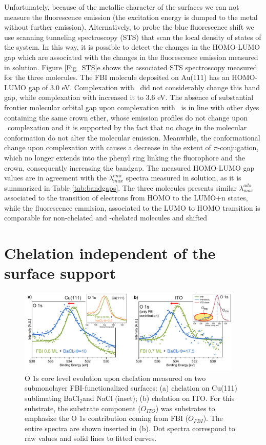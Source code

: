 \documentclass[aps,prl,reprint,longbibliography,superscriptaddress, english]{revtex4-1}
\def\BappCl{BaCl$_2$}
\begin{document}
Unfortunately, because of the metallic character of the surfaces we can not measure the fluorescence emission (the excitation energy is dumped to the metal without further emission). Alternatively, to probe the blue fluorescence shift we use scanning tunneling spectroscopy (STS) that scan the local density of states of the system. In this way, it is possible to detect the changes in the HOMO-LUMO gap which are associated with the changes in the fluorescence emission measured in solution. Figure {\ref{Fig_STS}e} shows the associated STS spectroscopy measured for the three molecules. The FBI molecule deposited on Au(111) has an HOMO-LUMO gap of 3.0 eV. Complexation with \Nap\ did not considerably change this band gap, while complexation with \Bapp increased it to 3.6 eV. The absence of substantial frontier molecular orbital gap upon complexation with \Nap\ is in line with other dyes containing the same crown ether, whose emission profiles do not change upon \Nap\ complexation\cite{ast_high_2011} and it is supported by the fact that no chage in the molecular conformation do not alter the molecular emission. Meanwhile, the conformational change upon complexation with \Bapp causes a decrease in the extent of $\pi$-conjugation, which no longer extends into the phenyl ring linking the fluorophore and the crown, consequently increasing the bandgap.  The measured HOMO-LUMO gap values are in agreement with the $\lambda^{emi}_{max}$ spectra measured in solution, as it is summarized in Table \ref{tab:bandgaps}. The three molecules presents similar $\lambda^{ads}_{max}$ associated to the transition of electrons from HOMO to the LUMO+n states, while the fluorescence emmision, associated to the LUMO to HOMO transition is comparable for non-chelated and \Nap-chelated molecules and shifted 


\section{Chelation independent of the surface support}


\begin{figure}[ht!]
	\includegraphics[width=0.95\textwidth]{figures/Figure_5.png}
	\caption{\label{XPS_FBI_Cu_ITO} 
    O 1s core level evolution upon chelation measured on two submonolayer FBI-functionalized surfaces: (a) chelation on Cu(111) sublimating \BappCl and NaCl (inset); (b) chelation on ITO. For this substrate, the substrate component (${O_{ITO}}$) was substrates to emphasize the O 1s contribution coming from FBI (${O_{FBI}}$). The entire spectra are shown inserted in (b). Dot spectra correspond to raw values and solid lines to fitted curves.}
\end{figure} 
\end{document}
